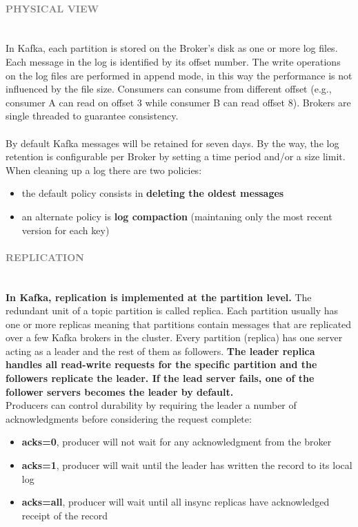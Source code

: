 \documentclass[10pt,a4paper]{article}
\newcommand{\nline}{\\~\\}
\newcommand{\myparagraph}[1]{\paragraph{\normalsize{\textcolor{gray}{\uppercase{\textbf{#1}}}} }\mbox{} \vspace{0.5em}\\}
\begin{document}
\myparagraph{Physical View}
In Kafka, each partition is stored on the Broker’s disk as one or more log files. Each message in the log is identified by its offset number. The write operations on the log files are performed in append mode, in this way the performance is not influenced by the file size.
Consumers can consume from different offset (e.g., consumer A can read on offset 3 while consumer B can read offset 8). Brokers are single threaded to guarantee consistency.
\nline
By default Kafka messages will be retained for seven days. By the way, the log retention is configurable per Broker by setting a time period and/or a size limit. 
When cleaning up a log there are two policies:
\begin{itemize}
	\item the default policy consists in \textbf{deleting the oldest messages}
	\item an alternate policy is \textbf{log compaction} (maintaning only the most recent version for each key)
\end{itemize}

\myparagraph{Replication}
\textbf{In Kafka, replication is implemented at the partition level.} The redundant unit of a topic partition is called replica. Each partition usually has one or more replicas meaning that partitions contain messages that are replicated over a few Kafka brokers in the cluster. 	Every partition (replica) has one server acting as a leader and the rest of them as followers. \textbf{The leader replica handles all read-write requests for the specific partition and the followers replicate the leader. If the lead server fails, one of the follower servers becomes the leader by default.}  \\
Producers can control durability by requiring the leader a number of acknowledgments before considering the request complete:
\begin{itemize}
	\item \textbf{acks=0}, producer will not wait for any acknowledgment from the broker
	\item \textbf{acks=1}, producer will wait until the leader has written the record to its local log
	\item \textbf{acks=all}, producer will wait until all insync replicas have acknowledged receipt of the record
\end{itemize}
\end{document}
